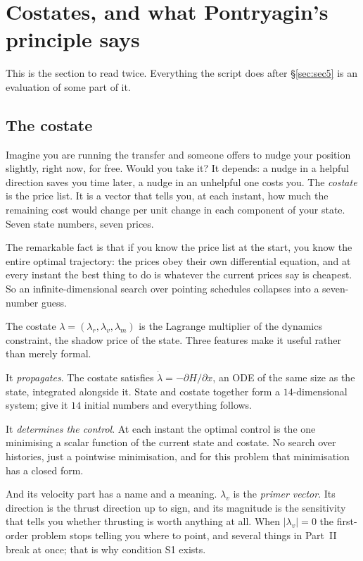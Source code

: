 \documentclass[11pt]{article}
\newcommand{\lv}{\lambda_v}\newcommand{\lr}{\lambda_r}\newcommand{\lm}{\lambda_m}
\begin{document}
\section{Costates, and what Pontryagin's principle says}\label{sec:pmp}

This is the section to read twice. Everything the script does after
\S\ref{sec:sec5} is an evaluation of some part of it.

\subsection{The costate}

\begin{eli}
Imagine you are running the transfer and someone offers to nudge your position
slightly, right now, for free. Would you take it? It depends: a nudge in a
helpful direction saves you time later, a nudge in an unhelpful one costs you.
The \emph{costate} is the price list. It is a vector that tells you, at each
instant, how much the remaining cost would change per unit change in each
component of your state. Seven state numbers, seven prices.

The remarkable fact is that if you know the price list at the start, you know
the entire optimal trajectory: the prices obey their own differential equation,
and at every instant the best thing to do is whatever the current prices say is
cheapest. So an infinite-dimensional search over pointing schedules collapses
into a seven-number guess.
\end{eli}

\begin{intu}
The costate $\lambda = (\lr, \lv, \lm)$ is the Lagrange multiplier of the
dynamics constraint, the shadow price of the state. Three features make it
useful rather than merely formal.

It \emph{propagates}. The costate satisfies $\dot\lambda = -\partial H/\partial x$,
an ODE of the same size as the state, integrated alongside it. State and
costate together form a $14$-dimensional system; give it $14$ initial numbers
and everything follows.

It \emph{determines the control}. At each instant the optimal control is the
one minimising a scalar function of the current state and costate. No search
over histories, just a pointwise minimisation, and for this problem that
minimisation has a closed form.

And its velocity part has a name and a meaning. $\lv$ is the \emph{primer
vector}. Its direction is the thrust direction up to sign, and its magnitude is
the sensitivity that tells you whether thrusting is worth anything at all. When
$|\lv| = 0$ the first-order problem stops telling you where to point, and
several things in Part~II break at once; that is why condition S1 exists.
\end{intu}
\end{document}

